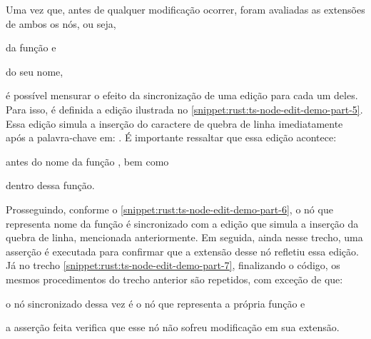 \documentclass
  [11pt,a4paper,english,brazil,openright,sumario=tradicional,twoside]
  {abntex2}
\begin{document}
\begin{apendicesenv}
{{    Uma vez que, antes de qualquer modificação ocorrer, foram avaliadas as
    extensões de ambos os nós, ou seja,
    \begin{inparaenum}
      \item da função  e
      \item do seu nome,
    \end{inparaenum}
    é possível mensurar o efeito da sincronização de uma edição para cada um
    deles. Para isso, é definida a edição ilustrada no
    \cref{snippet:rust:ts-node-edit-demo-part-5}. Essa edição simula a inserção
    do caractere de quebra de linha imediatamente após a palavra-chave
     em: .
    É importante ressaltar que essa edição acontece:
    \begin{inparaenum}
      \item antes do nome da função , bem como
      \item dentro dessa função.
    \end{inparaenum}

    Prosseguindo, conforme o \cref{snippet:rust:ts-node-edit-demo-part-6}, o
    nó que representa nome da função  é sincronizado
    com a edição que simula a inserção da quebra de linha, mencionada
    anteriormente. Em seguida, ainda nesse trecho, uma asserção é executada
    para confirmar que a extensão desse nó refletiu essa edição. Já no trecho
    \ref{snippet:rust:ts-node-edit-demo-part-7}, finalizando o código, os
    mesmos procedimentos do trecho anterior são repetidos, com exceção de que:
    \begin{inparaenum}
      \item o nó sincronizado dessa vez é o nó que representa a própria função
            e
      \item a asserção feita verifica que esse nó não sofreu modificação em sua
            extensão.
    \end{inparaenum}

}}
\end{apendicesenv}
\end{document}
